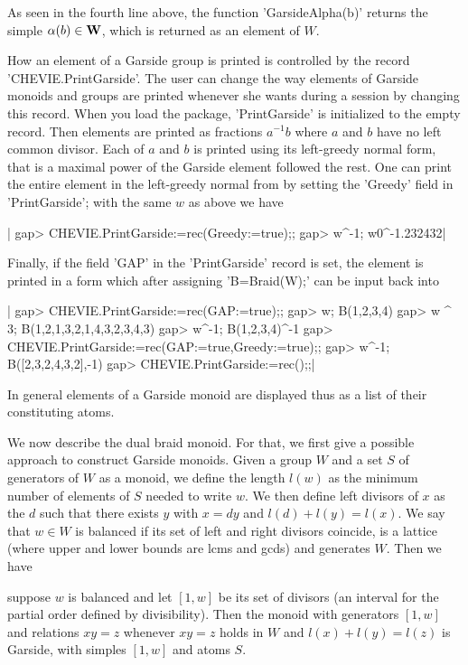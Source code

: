 As  seen in the  fourth line above,  the function 'GarsideAlpha(b)' returns
the simple $\alpha(b)\in{\bf W}$, which is returned as an element of $W$.

How  an element of a  Garside group is printed  is controlled by the record
'CHEVIE.PrintGarside'.  The  user  can  change  the way elements of Garside
monoids  and groups are printed whenever  she wants during a {\GAP} session
by   changing   this   record.   When   you  load  the  {\CHEVIE}  package,
'PrintGarside'  is  initialized  to  the  empty  record.  Then elements are
printed  as  fractions  $a^{-1}b$  where  $a$  and  $b$ have no left common
divisor.  Each of $a$ and $b$ is printed using its left-greedy normal form,
that  is a maximal power of the  Garside element followed the rest. One can
print  the entire  element in  the left-greedy  normal from  by setting the
'Greedy' field in 'PrintGarside'; with the same $w$ as above we have\:

|    gap> CHEVIE.PrintGarside:=rec(Greedy:=true);;
    gap> w^-1;
    w0^-1.232432|

Finally,  if  the  field  'GAP'  in  the  'PrintGarside' record is set, the
element  is printed in a form  which after assigning 'B\:=Braid(W);' can be
input back into {\GAP}\:

|    gap> CHEVIE.PrintGarside:=rec(GAP:=true);;
    gap> w;
    B(1,2,3,4)
    gap> w ^ 3;
    B(1,2,1,3,2,1,4,3,2,3,4,3)
    gap> w^-1;
    B(1,2,3,4)^-1
    gap> CHEVIE.PrintGarside:=rec(GAP:=true,Greedy:=true);;
    gap> w^-1;
    B([2,3,2,4,3,2],-1)
    gap> CHEVIE.PrintGarside:=rec();;|

In  general elements of  a Garside monoid  are displayed thus  as a list of
their constituting atoms.

We  now describe the dual braid monoid.  For that, we first give a possible
approach  to construct Garside monoids. Given a  group $W$ and a set $S$ of
generators  of $W$ as a monoid, we  define the length $l(w)$ as the minimum
number of elements of $S$ needed to write $w$. We then define left divisors
of   $x$  as  the  $d$   such  that  there  exists   $y$  with  $x=dy$  and
$l(d)+l(y)=l(x)$.  We say that $w\in W$ is  balanced if its set of left and
right  divisors coincide,  is a  lattice (where  upper and lower bounds are
lcms and gcds) and generates $W$. Then we have\:

suppose $w$ is balanced and let $[1,w]$ be its set of divisors (an interval
for  the  partial  order  defined  by  divisibility).  Then the monoid with
generators  $[1,w]$ and relations  $xy=z$ whenever $xy=z$  holds in $W$ and
$l(x)+l(y)=l(z)$ is Garside, with simples $[1,w]$ and atoms $S$.

